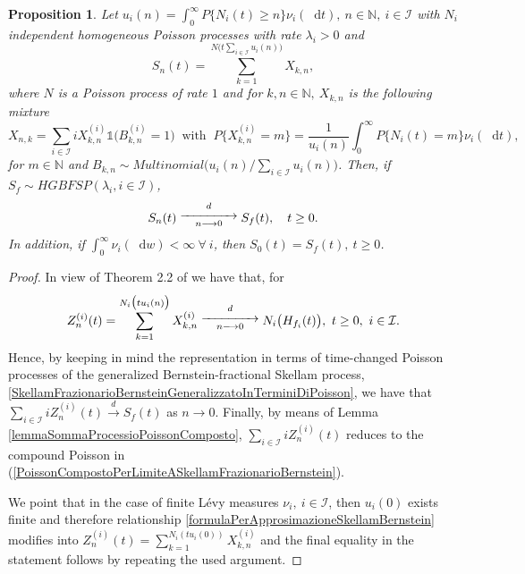 \documentclass[12pt, twoside, english, headsepline]{article}
\newcommand*\dif{\mathop{}\!\mathrm{d}}  %
\newtheorem{proposition}{Proposition}[section] %
\theoremstyle{definition} %
\numberwithin{equation}{section} %
\begin{document}
\begin{proposition}
Let $u_i(n) = \int_0^\infty P\{N_i(t)\ge n\}\nu_i(\dif t), \ n\in\mathbb{N}, \ i \in\mathcal{I}$ with $N_i$ independent homogeneous Poisson processes with rate $\lambda_i>0$ and 
\begin{equation}\label{PoissonCompostoPerLimiteASkellamFrazionarioBernstein}
S_n(t) = \sum_{k=1}^{N\big(t\sum_{i\in\mathcal{I} }u_i(n)\big)} X_{k,n},
\end{equation}
where $N$  is a Poisson process of rate $1$ and for $k,n\in\mathbb{N}, \ X_{k,n}$ is the following mixture
\begin {equation*}
X_{n,k} = \sum_{i\in\mathcal{I}} iX_{k,n}^{(i)}\mathds{1}\big(B_{k,n}^{(i)} = 1\big)\ \text{ with }\ P\big\{X_{k,n}^{(i)} = m\big\} = \frac{1}{u_i(n)}\int_0^\infty P\{N_i(t)=m\}\nu_i(\dif t),
\end{equation*}
for $m\in\mathbb{N}$ and $B_{k,n}\sim Multinomial\big(u_i(n)/\sum_{i\in\mathcal{I}}u_i(n)\big)$. Then, if $S_f\sim HGBFSP (\lambda_i, i\in \mathcal{I} )$, 
$$ S_n(t) \stackrel{d}{\substack{\xrightarrow{\hspace*{1.4cm}}\\ n\longrightarrow0} }S_f(t),\ \ \ t\ge0.$$
In addition, if $\int_0^\infty \nu_i(\dif w)<\infty \ \forall\ i$, then $S_0 (t) = S_f(t),\ t\ge0$.
\end{proposition}

\begin{proof}
In view of Theorem 2.2 of \cite{OT2015} we have that, for 
\begin{equation}\label{formulaPerApprosimazioneSkellamBernstein}
	Z_n^{(i)}(t) = \sum_{k=1}^{N_i\big(tu_i(n)\big)} X_{k,n}^{(i)} \stackrel{d}{\substack{\xrightarrow{\hspace*{1.4cm}}\\ n\longrightarrow0} }N_i\big(H_{f_i}(t)\big), \ t\ge0, \ i\in\mathcal{I}.
	\end{equation}
Hence, by keeping in mind the representation in terms of time-changed Poisson processes of the generalized Bernstein-fractional Skellam process, \eqref{SkellamFrazionarioBernsteinGeneralizzatoInTerminiDiPoisson}, we have that $\sum_{i\in\mathcal{I}}iZ_n^{(i)}(t)  \stackrel{d}{\rightarrow}S_f(t)$ as $n\longrightarrow0$. Finally, by means of Lemma \ref{lemmaSommaProcessioPoissonComposto}, $\sum_{i\in\mathcal{I}}iZ_n^{(i)}(t) $ reduces to the compound Poisson in (\ref{PoissonCompostoPerLimiteASkellamFrazionarioBernstein}).

We point that in the case of finite L\'{e}vy measures $\nu_i, \ i\in\mathcal{I}$, then $u_i(0)$ exists finite and therefore relationship \eqref{formulaPerApprosimazioneSkellamBernstein} modifies into $Z_n^{(i)}(t) = \sum_{k=1}^{N_i(t u_i(0))} X_{k,n}^{(i)}$ and the final equality in the statement follows by repeating the used argument.
\end{proof}
\end{document}
